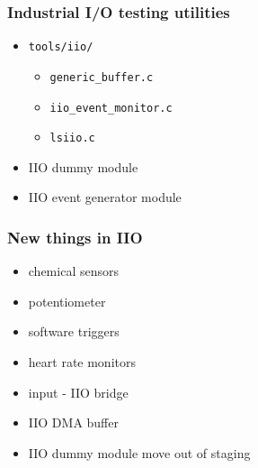 \documentclass[aspectratio=169]{beamer}
\begin{document}

%




\begin{frame}
\frametitle{Industrial I/O testing utilities}
\begin{itemize}
    \item \texttt{tools/iio/}
    \begin{itemize}
        \item \texttt{generic\_buffer.c}
        \item \texttt{iio\_event\_monitor.c}
        \item \texttt{lsiio.c}
    \end{itemize}
    \item IIO dummy module
    \item IIO event generator module
\end{itemize}
\end{frame}




\begin{frame}
\frametitle{New things in IIO}
\begin{itemize}
    \item chemical sensors
    \item potentiometer
    \item software triggers
    \item heart rate monitors
    \item input - IIO bridge
    \item IIO DMA buffer
    \item IIO dummy module move out of staging
\end{itemize}
\end{frame}
\end{document}
